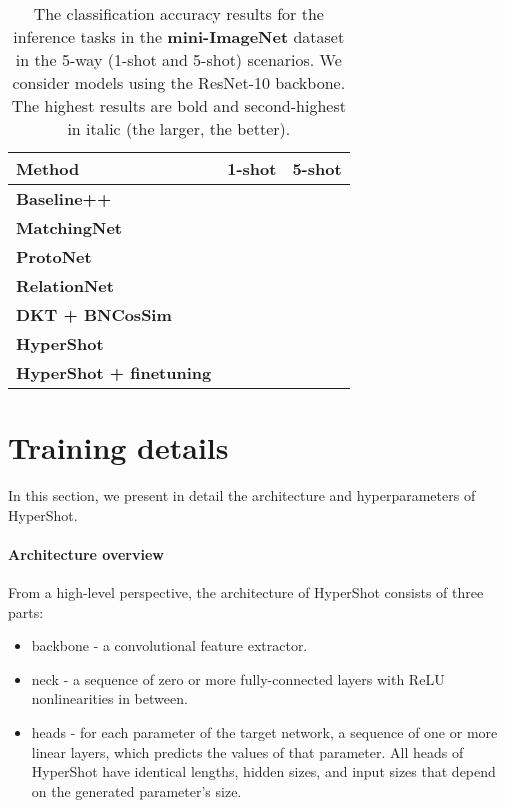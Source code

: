 \documentclass[nohyperref]{article}
\def\our{HyperShot}
\theoremstyle{plain}
\theoremstyle{definition}
\theoremstyle{remark}
\begin{document}
\begin{table*}[h!]
\centering
\caption{
    The classification accuracy results for the inference tasks in the \textbf{mini-ImageNet} dataset in the 5-way (1-shot and 5-shot) scenarios. We consider models using the ResNet-10 backbone. The highest results are bold and second-highest in italic (the larger, the better).}
\label{tab:miniresnet}
\begin{tabular}{lcc}
\toprule
\textbf{Method}    & \textbf{1-shot} & \textbf{5-shot} \\
\midrule
\textbf{Baseline++}  \cite{chen2019closer}  &  &  \\
\textbf{MatchingNet} \cite{vinyals2016matching}   &  &  \\
\textbf{ProtoNet} \cite{snell2017prototypical}   &  &  \\
\textbf{RelationNet}  \cite{sung2018learning}  &   &  \\
\textbf{DKT + BNCosSim} \cite{patacchiola2020bayesian}   &  &  \\
\midrule
\textbf{\our{}} &  &   \\
\textbf{\our{} + finetuning}   &  &    \\
\bottomrule
\end{tabular}
\end{table*}



\section{Training details}

In this section, we present in detail the architecture and hyperparameters of \our{}.

\paragraph{Architecture overview}

    From a high-level perspective, the architecture of \our{} consists of three parts:
    \begin{itemize}
        \item backbone - a convolutional feature extractor.
        \item neck - a sequence of zero or more fully-connected layers with ReLU nonlinearities in between.
        \item heads - for each parameter of the target network, a sequence of one or more linear layers, which predicts the values of that parameter. All heads of \our{} have identical lengths, hidden sizes, and input sizes that depend on the generated parameter's size.
    \end{itemize}
    
\end{document}
